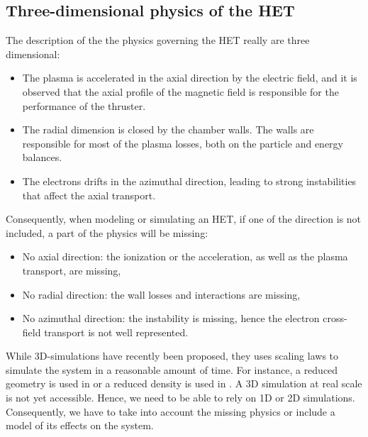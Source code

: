 \subsection*{Three-dimensional physics of the HET}
\label{sec-3Dphi}

The description of the the physics governing the \ac{HET} really are three dimensional\string:
\begin{itemize}
  \item The plasma is accelerated in the axial direction by the electric field, and it is observed that the axial profile of the magnetic field is responsible for the performance of the thruster.
  \item The radial dimension is closed by the chamber walls. The walls are responsible for most of the plasma losses, both on the particle and energy balances.
  \item The electrons drifts in the azimuthal direction, leading to strong instabilities that affect the axial transport.
\end{itemize}

Consequently, when modeling or simulating an \ac{HET}, if one of the direction is not included, a part of the physics will be missing\string:
\begin{itemize}
  \item No axial direction\string: the ionization or the acceleration, as well as the plasma transport, are missing,
  \item No radial direction\string: the wall losses and interactions are missing,
  \item No azimuthal direction\string: the instability is missing, hence the electron cross-field transport is not well represented.
\end{itemize}

While \ac{3D}-simulations have recently been proposed, they uses scaling laws to simulate the system in a reasonable amount of time\citep{taccogna2019a}.
For instance, a reduced geometry is used in \citet{taccogna2018} or a reduced density is used in \citet{fubiani2018a}.
A \ac{3D} simulation at real scale is not yet accessible.
Hence, we need to be able to rely on \ac{1D} or \ac{2D} simulations.
Consequently, we have to take into account the missing physics or include a model of its effects on the system.
